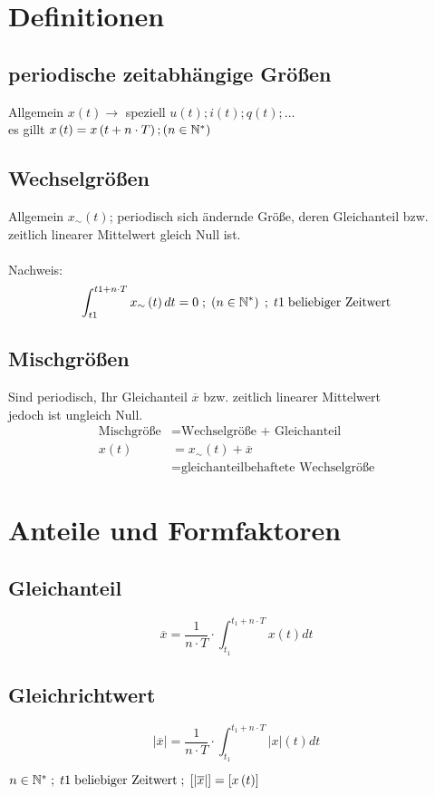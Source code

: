 \section{Definitionen}

\subsection{periodische zeitabhängige Größen}
Allgemein \(x\left(t\right) \xrightarrow{}\) speziell \(u\left(t\right); i\left(t\right); q\left(t\right); \dots\) \\
es gillt \(x\left(t\right) = x\left(t + n \cdot T\right) ; \left(n \in \mathbb{N}^* \right) \)

\subsection{Wechselgrößen}
Allgemein \(x_{\sim} \left(t\right)\); periodisch sich ändernde Größe, deren Gleichanteil bzw. 
zeitlich linearer Mittelwert gleich Null ist. \\ \vspace{0mm} \\
Nachweis: \[\int_{t1}^{t1 + n \cdot T} x_{\sim} \left(t\right)dt = 0 \; ; \; \left(n \in \mathbb{N}^* \right) \;
; \; t1 \; \text{beliebiger Zeitwert}\]

\subsection{Mischgrößen}
Sind periodisch, Ihr Gleichanteil \(\overline{x}\) bzw. zeitlich linearer Mittelwert \\
jedoch ist ungleich Null. 
\begin{align*}
\text{Mischgröße} &= \text{Wechselgröße + Gleichanteil} \\
x\left(t\right) &= x_{\sim}\left(t\right) + \overline{x} \\
&= \text{gleichanteilbehaftete Wechselgröße}
\end{align*}

\newpage
\section{Anteile und Formfaktoren}

\begin{multicols}{2}{}
\subsection{Gleichanteil}
\[ \overline{x} = \frac{1}{n \cdot T} \cdot \int_{t_{1}}^{t_{1} + n \cdot T} x \left( t \right) dt \]
\hfill

\subsection{Gleichrichtwert}
\[ \left| \overline{x} \right| = \frac{1}{n \cdot T} \cdot 
\int_{t_{1}}^{t_{1} + n \cdot T} \left| x \right| \left( t \right) dt\]
\hfill
\end{multicols}

\(n \in \mathbb{N}^* \;; \; t1 \; \text{beliebiger Zeitwert} \;; \; 
\left[|\overline{x} \right|] = \left[ x\left( t \right) \right] \)


